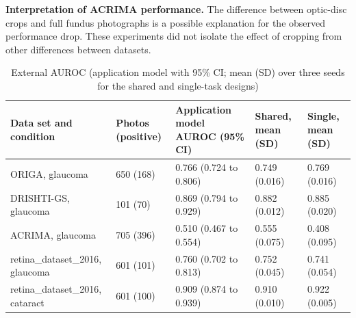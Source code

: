 \documentclass[conference,a4paper]{IEEEtran}
\newcommand{\peachaddition}[1]{%
  \par\smallskip\noindent
  \begingroup\setlength{\fboxsep}{5pt}%
  \colorbox{reviewpeach}{\begin{minipage}{\dimexpr\linewidth-2\fboxsep\relax}
  #1
  \end{minipage}}\endgroup\par\smallskip
}
\begin{document}
\peachaddition{
\textbf{Interpretation of ACRIMA performance.}
The difference between optic-disc crops and full fundus photographs is a possible
explanation for the observed performance drop. These experiments did not isolate
the effect of cropping from other differences between datasets.
}

\begin{table}[t]
\caption{External AUROC (application model with 95\% CI; mean (SD) over three seeds for the shared and single-task designs)}
\label{tab:II}\centering\small
\begin{tabular}{@{}lllll@{}}\toprule
Data set and condition & Photos (positive) & Application model AUROC (95\% CI) & Shared, mean (SD) & Single, mean (SD) \\ \midrule
ORIGA, glaucoma & 650 (168) & 0.766 (0.724 to 0.806) & 0.749 (0.016) & 0.769 (0.016) \\
DRISHTI-GS, glaucoma & 101 (70) & 0.869 (0.794 to 0.929) & 0.882 (0.012) & 0.885 (0.020) \\
ACRIMA, glaucoma & 705 (396) & 0.510 (0.467 to 0.554) & 0.555 (0.075) & 0.408 (0.095) \\
retina\_dataset\_2016, glaucoma & 601 (101) & 0.760 (0.702 to 0.813) & 0.752 (0.045) & 0.741 (0.054) \\
retina\_dataset\_2016, cataract & 601 (100) & 0.909 (0.874 to 0.939) & 0.910 (0.010) & 0.922 (0.005) \\ \bottomrule
\end{tabular}


\end{table}
\end{document}
